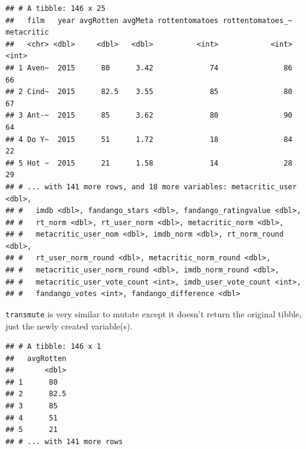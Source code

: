 \documentclass[
]{book}
\newenvironment{Shaded}{\begin{snugshade}}{\end{snugshade}}
\newcommand{\DataTypeTok}[1]{\textcolor[rgb]{0.13,0.29,0.53}{#1}}
\newcommand{\DecValTok}[1]{\textcolor[rgb]{0.00,0.00,0.81}{#1}}
\newcommand{\KeywordTok}[1]{\textcolor[rgb]{0.13,0.29,0.53}{\textbf{#1}}}
\newcommand{\NormalTok}[1]{#1}
\newcommand{\OperatorTok}[1]{\textcolor[rgb]{0.81,0.36,0.00}{\textbf{#1}}}
\newcommand{\StringTok}[1]{\textcolor[rgb]{0.31,0.60,0.02}{#1}}
\theoremstyle{definition}
\theoremstyle{definition}
\theoremstyle{definition}
\theoremstyle{remark}
\begin{document}
\begin{verbatim}
## # A tibble: 146 x 25
##   film   year avgRotten avgMeta rottentomatoes rottentomatoes_~ metacritic
##   <chr> <dbl>     <dbl>   <dbl>          <int>            <int>      <int>
## 1 Aven~  2015      80      3.42             74               86         66
## 2 Cind~  2015      82.5    3.55             85               80         67
## 3 Ant-~  2015      85      3.62             80               90         64
## 4 Do Y~  2015      51      1.72             18               84         22
## 5 Hot ~  2015      21      1.58             14               28         29
## # ... with 141 more rows, and 18 more variables: metacritic_user <dbl>,
## #   imdb <dbl>, fandango_stars <dbl>, fandango_ratingvalue <dbl>,
## #   rt_norm <dbl>, rt_user_norm <dbl>, metacritic_norm <dbl>,
## #   metacritic_user_nom <dbl>, imdb_norm <dbl>, rt_norm_round <dbl>,
## #   rt_user_norm_round <dbl>, metacritic_norm_round <dbl>,
## #   metacritic_user_norm_round <dbl>, imdb_norm_round <dbl>,
## #   metacritic_user_vote_count <int>, imdb_user_vote_count <int>,
## #   fandango_votes <int>, fandango_difference <dbl>
\end{verbatim}

\texttt{transmute} is very similar to mutate except it doesn't return the original tibble, just the newly created variable(s).

\begin{Shaded}
\end{Shaded}

\begin{verbatim}
## # A tibble: 146 x 1
##   avgRotten
##       <dbl>
## 1      80  
## 2      82.5
## 3      85  
## 4      51  
## 5      21  
## # ... with 141 more rows
\end{verbatim}

\begin{Shaded}
\end{Shaded}
\end{document}
